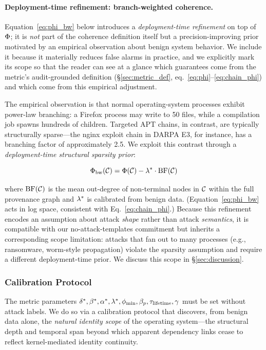 \paragraph{Deployment-time refinement: branch-weighted coherence.} Equation~\ref{eq:phi_bw} below introduces a \emph{deployment-time refinement} on top of $\Phi$; it is \emph{not} part of the coherence definition itself but a precision-improving prior motivated by an empirical observation about benign system behavior. We include it because it materially reduces false alarms in practice, and we explicitly mark its scope so that the reader can see at a glance which guarantees come from the metric's audit-grounded definition (\S\ref{sec:metric_def}, eq.~\ref{eq:phi}--\ref{eq:chain_phi}) and which come from this empirical adjustment.

The empirical observation is that normal operating-system processes exhibit power-law branching: a Firefox process may write to 50 files, while a compilation job spawns hundreds of children. Targeted APT chains, in contrast, are typically structurally sparse---the nginx exploit chain in DARPA E3, for instance, has a branching factor of approximately 2.5. We exploit this contrast through a \emph{deployment-time structural sparsity prior}:

\begin{equation}
\Phi_{\text{bw}}(\mathcal{C}) = \Phi(\mathcal{C}) - \lambda^* \cdot \operatorname{BF}(\mathcal{C})
\label{eq:phi_bw}
\end{equation}

where $\operatorname{BF}(\mathcal{C})$ is the mean out-degree of non-terminal nodes in $\mathcal{C}$ within the full provenance graph and $\lambda^*$ is calibrated from benign data. (Equation~\ref{eq:phi_bw} acts in log space, consistent with Eq.~\ref{eq:chain_phi}.) Because this refinement encodes an assumption about attack \emph{shape} rather than attack \emph{semantics}, it is compatible with our no-attack-templates commitment but inherits a corresponding scope limitation: attacks that fan out to many processes (e.g., ransomware, worm-style propagation) violate the sparsity assumption and require a different deployment-time prior. We discuss this scope in \S\ref{sec:discussion}.

\subsubsection{Calibration Protocol}
\label{sec:calibration}

The metric parameters $\delta^*, \beta^*, \alpha^*, \lambda^*, \phi_{\min}, \beta_p, \tau_{\text{lifetime}}, \gamma$ must be set without attack labels. We do so via a calibration protocol that discovers, from benign data alone, the \emph{natural identity scope} of the operating system---the structural depth and temporal span beyond which apparent dependency links cease to reflect kernel-mediated identity continuity.

